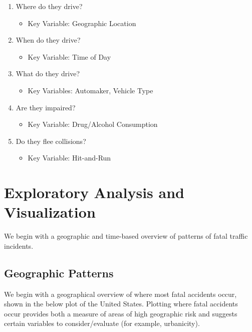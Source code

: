 \documentclass[11pt, oneside,titlepage]{article}   	%
\begin{document}
\begin{enumerate}
\item Where do they drive?
\begin{itemize}
\item Key Variable: Geographic Location
\end{itemize}
\item When do they drive?
\begin{itemize}
\item Key Variable: Time of Day
\end{itemize}
\item What do they drive?
\begin{itemize}
\item Key Variables: Automaker, Vehicle Type
\end{itemize}
\item Are they impaired?
\begin{itemize}
\item Key Variable: Drug/Alcohol Consumption
\end{itemize}
\item Do they flee collisions?
\begin{itemize}
\item Key Variable: Hit-and-Run
\end{itemize}
\end{enumerate}

\section*{Exploratory Analysis and Visualization}

We begin with a geographic and time-based overview of patterns of fatal traffic incidents.

\subsection*{Geographic Patterns}

We begin with a geographical overview of where most fatal accidents occur, shown in the below plot of the United States. Plotting where fatal accidents occur provides both a measure of areas of high geographic risk and suggests certain variables to consider/evaluate (for example, urbanicity).
\end{document}
